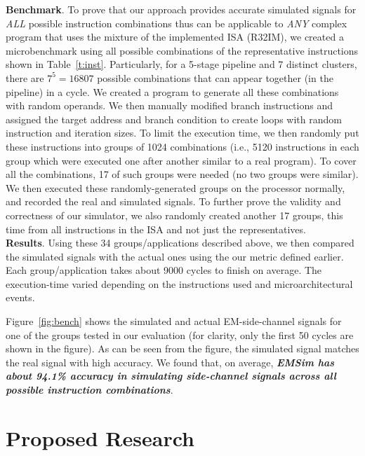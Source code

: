 \documentclass[11 pt]{article}
\begin{document}
\noindent\textbf{Benchmark}. To prove that our approach provides accurate simulated signals for \textit{ALL} possible instruction combinations thus can be applicable to \textit{ANY} complex program that uses the mixture of the implemented ISA (R32IM), we created a microbenchmark using all possible combinations of the representative instructions shown in Table~\ref{t:inst}. Particularly, for a 5-stage pipeline and 7 distinct clusters, there are $7^5=16807$ possible combinations that can appear together (in the pipeline) in a cycle. We created a program to generate all these combinations with random operands. We then manually modified branch instructions and assigned the target address and branch condition to create loops with random instruction and iteration sizes.  To limit the execution time, we then randomly put these instructions into groups of 1024 combinations (i.e., 5120 instructions in each group which were executed one after another similar to a real program). To cover all the combinations, 17 of such groups were needed (no two groups were similar). We then executed these randomly-generated groups on the processor normally, and recorded the real and simulated signals. To further prove the validity and correctness of our simulator, we also randomly created another 17 groups, this time from all  instructions in the ISA and not just the representatives. \\

\noindent\textbf{Results}. Using these 34 groups/applications described above, we then compared the simulated signals with the actual ones using the our metric defined earlier. Each group/application takes about 9000 cycles to finish on average. The execution-time varied depending on the instructions used and microarchitectural events.

Figure~\ref{fig:bench} shows the simulated and actual EM-side-channel signals for one of the groups tested in our evaluation (for clarity, only the first 50 cycles are shown in the figure). As can be seen from the figure, the simulated signal matches the real signal with high accuracy. We found that, on average, \textbf{\textit{EMSim has about 94.1\% accuracy in simulating side-channel signals across all possible instruction combinations}}.



% 

\section{Proposed Research}
\end{document}
